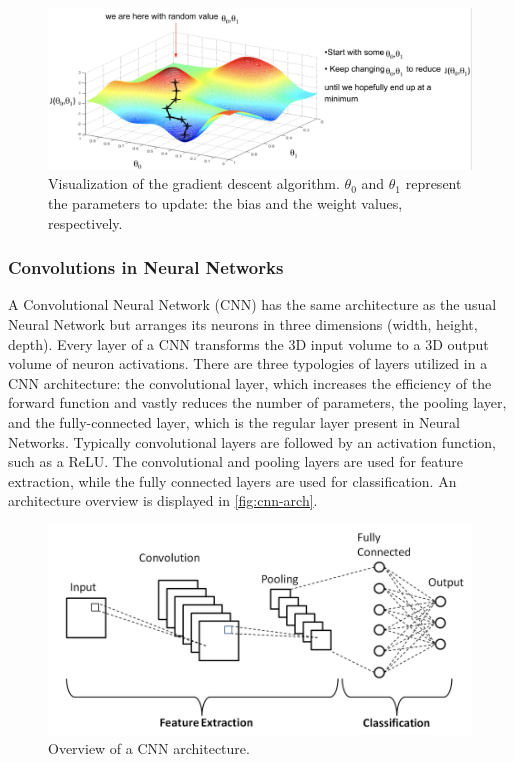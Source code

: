 \begin{figure}[!htb]
	\centering
	\includegraphics[width=0.9\linewidth]{images/approaches/deep_learning/grad_descent.png}
	\caption{Visualization of the gradient descent algorithm. $\theta_0$ and $\theta_1$ represent the parameters to update: the bias and the weight values, respectively.}
	\label{fig:grad-descent}
\end{figure}


\FloatBarrier
\subsubsection*{Convolutions in Neural Networks}

A Convolutional Neural Network (CNN) has the same architecture as the usual Neural Network but arranges its neurons in three dimensions (width, height, depth). Every layer of a CNN transforms the 3D input volume to a 3D output volume of neuron activations.
There are three typologies of layers utilized in a CNN architecture: the convolutional layer, which increases the efficiency of the forward function and vastly reduces the number of parameters, the pooling layer, and the fully-connected layer, which is the regular layer present in Neural Networks.
Typically convolutional layers are followed by an activation function, such as a ReLU.
The convolutional and pooling layers are used for feature extraction, while the fully connected layers are used for classification. An architecture overview is displayed in \autoref{fig:cnn-arch}.

\begin{figure}[h]
	\centering
	\includegraphics[width=0.9\linewidth]{images/approaches/deep_learning/cnn_arch.png}
	\caption{Overview of a CNN architecture.}
	\label{fig:cnn-arch}
\end{figure}

